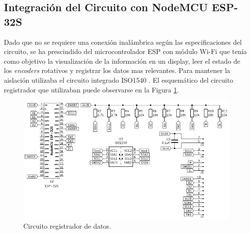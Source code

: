 \subsection{Integración del Circuito con NodeMCU ESP-32S}
Dado que no se requiere una conexión inalámbrica según las especificaciones del circuito, se ha prescindido del microcontrolador ESP con módulo Wi-Fi que tenía como objetivo la visualización de la información en un display, leer el estado de los \textit{encoders} rotativos y registrar los datos mas relevantes. Para mantener la aislación utilizaba el circuito integrado ISO1540 \cite{ISO1540}. El esquemático del circuito registrador que utilizaban puede observarse en la Figura \ref{F:ESP_32S}.
\begin{figure}[H]
    \centering
    \includegraphics[scale=0.5]{./imagenes/ESP_32S.jpg}
    \caption{Circuito registrador de datos.}
    \label{F:ESP_32S}
\end{figure}

